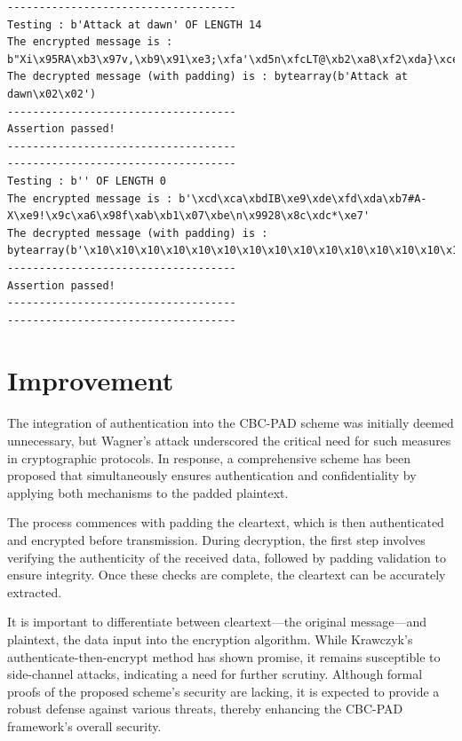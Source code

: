 \documentclass[conference]{IEEEtran}
\begin{document}

\begin{tcolorbox}[title={Attack Test Output}]
\begin{lstlisting}
------------------------------------
Testing : b'Attack at dawn' OF LENGTH 14
The encrypted message is : b"Xi\x95RA\xb3\x97v,\xb9\x91\xe3;\xfa'\xd5n\xfcLT@\xb2\xa8\xf2\xda}\xceqM\xfff\xda"
The decrypted message (with padding) is : bytearray(b'Attack at dawn\x02\x02')
------------------------------------
Assertion passed!
------------------------------------
------------------------------------
Testing : b'' OF LENGTH 0
The encrypted message is : b'\xcd\xca\xbdIB\xe9\xde\xfd\xda\xb7#A-X\xe9!\x9c\xa6\x98f\xab\xb1\x07\xbe\n\x9928\x8c\xdc*\xe7'
The decrypted message (with padding) is : bytearray(b'\x10\x10\x10\x10\x10\x10\x10\x10\x10\x10\x10\x10\x10\x10\x10\x10')
------------------------------------
Assertion passed!
------------------------------------
------------------------------------
\end{lstlisting}
\end{tcolorbox}


\section{Improvement}

The integration of authentication into the CBC-PAD scheme was initially deemed unnecessary, but Wagner’s attack underscored the critical need for such measures in cryptographic protocols. In response, a comprehensive scheme has been proposed that simultaneously ensures authentication and confidentiality by applying both mechanisms to the padded plaintext.

The process commences with padding the cleartext, which is then authenticated and encrypted before transmission. During decryption, the first step involves verifying the authenticity of the received data, followed by padding validation to ensure integrity. Once these checks are complete, the cleartext can be accurately extracted.

It is important to differentiate between cleartext—the original message—and plaintext, the data input into the encryption algorithm. While Krawczyk's authenticate-then-encrypt method has shown promise, it remains susceptible to side-channel attacks, indicating a need for further scrutiny. Although formal proofs of the proposed scheme's security are lacking, it is expected to provide a robust defense against various threats, thereby enhancing the CBC-PAD framework's overall security.
\end{document}
